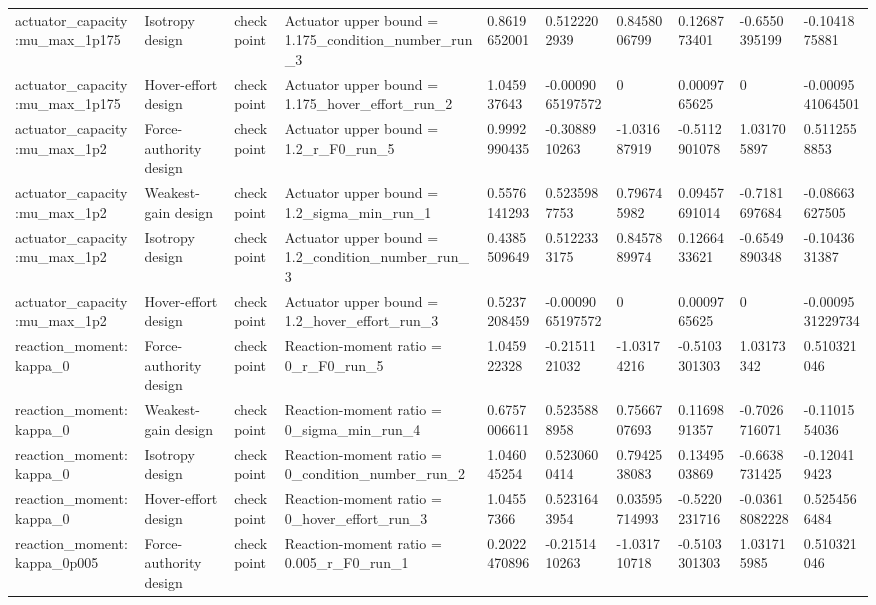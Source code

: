 \begin{tabular}{@{}llllllllll@{}}
actuator\_capacity:mu\_max\_1p175 & Isotropy design & checkpoint & Actuator upper bound = 1.175\_condition\_number\_run\_3 & 0.8619652001 & 0.5122202939 & 0.8458006799 & 0.1268773401 & -0.6550395199 & -0.1041875881 \\
actuator\_capacity:mu\_max\_1p175 & Hover-effort design & checkpoint & Actuator upper bound = 1.175\_hover\_effort\_run\_2 & 1.045937643 & -0.0009065197572 & 0 & 0.0009765625 & 0 & -0.0009541064501 \\
actuator\_capacity:mu\_max\_1p2 & Force-authority design & checkpoint & Actuator upper bound = 1.2\_r\_F0\_run\_5 & 0.9992990435 & -0.3088910263 & -1.031687919 & -0.5112901078 & 1.031705897 & 0.5112558853 \\
actuator\_capacity:mu\_max\_1p2 & Weakest-gain design & checkpoint & Actuator upper bound = 1.2\_sigma\_min\_run\_1 & 0.5576141293 & 0.5235987753 & 0.796745982 & 0.09457691014 & -0.7181697684 & -0.08663627505 \\
actuator\_capacity:mu\_max\_1p2 & Isotropy design & checkpoint & Actuator upper bound = 1.2\_condition\_number\_run\_3 & 0.4385509649 & 0.5122333175 & 0.8457889974 & 0.1266433621 & -0.6549890348 & -0.1043631387 \\
actuator\_capacity:mu\_max\_1p2 & Hover-effort design & checkpoint & Actuator upper bound = 1.2\_hover\_effort\_run\_3 & 0.5237208459 & -0.0009065197572 & 0 & 0.0009765625 & 0 & -0.0009531229734 \\
reaction\_moment:kappa\_0 & Force-authority design & checkpoint & Reaction-moment ratio = 0\_r\_F0\_run\_5 & 1.045922328 & -0.2151121032 & -1.03174216 & -0.5103301303 & 1.03173342 & 0.510321046 \\
reaction\_moment:kappa\_0 & Weakest-gain design & checkpoint & Reaction-moment ratio = 0\_sigma\_min\_run\_4 & 0.6757006611 & 0.5235888958 & 0.7566707693 & 0.1169891357 & -0.7026716071 & -0.1101554036 \\
reaction\_moment:kappa\_0 & Isotropy design & checkpoint & Reaction-moment ratio = 0\_condition\_number\_run\_2 & 1.046045254 & 0.5230600414 & 0.7942538083 & 0.1349503869 & -0.6638731425 & -0.120419423 \\
reaction\_moment:kappa\_0 & Hover-effort design & checkpoint & Reaction-moment ratio = 0\_hover\_effort\_run\_3 & 1.04557366 & 0.5231643954 & 0.03595714993 & -0.5220231716 & -0.03618082228 & 0.5254566484 \\
reaction\_moment:kappa\_0p005 & Force-authority design & checkpoint & Reaction-moment ratio = 0.005\_r\_F0\_run\_1 & 0.2022470896 & -0.2151410263 & -1.031710718 & -0.5103301303 & 1.031715985 & 0.510321046 \\

\end{tabular}
